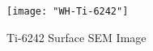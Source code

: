 \begin{figure}[H]
        \texttt{[image: "WH-Ti-6242"]}
        \caption{Ti-6242 Surface SEM Image}
        \label{fig:Ti-6242 Williamson-Hall Plot}
\end{figure}